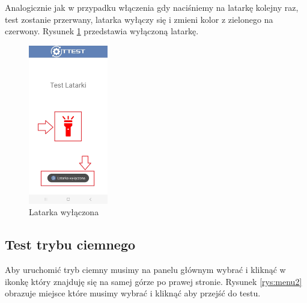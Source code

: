 Analogicznie jak w przypadku włączenia gdy naciśniemy na latarkę kolejny raz, test zostanie przerwany, latarka wyłączy się i zmieni kolor z zielonego na czerwony. Rysunek \ref{rys:latarka3} przedstawia wyłączoną latarkę.

\begin{figure}[!hbt]
	\begin{center}
		\includegraphics[angle=360, width=0.31\textwidth]{rys/punkt6/latarka3.jpg}
		\caption{Latarka wyłączona}
		\label{rys:latarka3}
	\end{center}
\end{figure}

\newpage


\subsection{Test trybu ciemnego}

\hspace{0.60cm}Aby uruchomić tryb ciemny musimy na panelu głównym wybrać i kliknąć w ikonkę który znajduję się na samej górze po prawej stronie. Rysunek \ref{rys:menu2} obrazuje miejsce które musimy wybrać i kliknąć aby przejść do testu.

